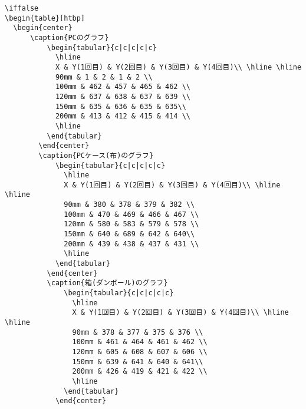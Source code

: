 \documentclass{jsarticle}
\begin{document}
\begin{verbatim}
\iffalse
\begin{table}[htbp]
  \begin{center}
      \caption{PCのグラフ}
          \begin{tabular}{c|c|c|c|c}
            \hline
            X & Y(1回目) & Y(2回目) & Y(3回目) & Y(4回目)\\ \hline \hline
            90mm & 1 & 2 & 1 & 2 \\
            100mm & 462 & 457 & 465 & 462 \\
            120mm & 637 & 638 & 637 & 639 \\
            150mm & 635 & 636 & 635 & 635\\
            200mm & 413 & 412 & 415 & 414 \\
            \hline
          \end{tabular}
        \end{center}
        \caption{PCケース(布)のグラフ}
            \begin{tabular}{c|c|c|c|c}
              \hline
              X & Y(1回目) & Y(2回目) & Y(3回目) & Y(4回目)\\ \hline \hline
              90mm & 380 & 378 & 379 & 382 \\
              100mm & 470 & 469 & 466 & 467 \\
              120mm & 580 & 583 & 579 & 578 \\
              150mm & 640 & 689 & 642 & 640\\
              200mm & 439 & 438 & 437 & 431 \\
              \hline
            \end{tabular}
          \end{center}
          \caption{箱(ダンボール)のグラフ}
              \begin{tabular}{c|c|c|c|c}
                \hline
                X & Y(1回目) & Y(2回目) & Y(3回目) & Y(4回目)\\ \hline \hline
                90mm & 378 & 377 & 375 & 376 \\
                100mm & 461 & 464 & 461 & 462 \\
                120mm & 605 & 608 & 607 & 606 \\
                150mm & 639 & 641 & 640 & 641\\
                200mm & 426 & 419 & 421 & 422 \\
                \hline
              \end{tabular}
            \end{center}

\end{verbatim}
\end{document}
